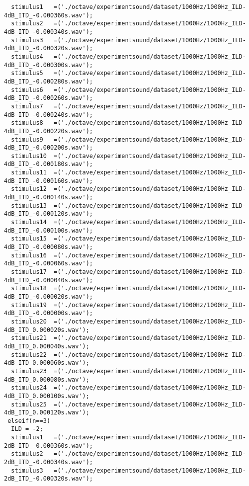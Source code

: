 {\begin{verbatim}
  stimulus1   =('./octave/experimentsound/dataset/1000Hz/1000Hz_ILD-4dB_ITD_-0.000360s.wav');
  stimulus2   =('./octave/experimentsound/dataset/1000Hz/1000Hz_ILD-4dB_ITD_-0.000340s.wav');
  stimulus3   =('./octave/experimentsound/dataset/1000Hz/1000Hz_ILD-4dB_ITD_-0.000320s.wav');
  stimulus4   =('./octave/experimentsound/dataset/1000Hz/1000Hz_ILD-4dB_ITD_-0.000300s.wav');
  stimulus5   =('./octave/experimentsound/dataset/1000Hz/1000Hz_ILD-4dB_ITD_-0.000280s.wav');
  stimulus6   =('./octave/experimentsound/dataset/1000Hz/1000Hz_ILD-4dB_ITD_-0.000260s.wav');
  stimulus7   =('./octave/experimentsound/dataset/1000Hz/1000Hz_ILD-4dB_ITD_-0.000240s.wav');
  stimulus8   =('./octave/experimentsound/dataset/1000Hz/1000Hz_ILD-4dB_ITD_-0.000220s.wav');
  stimulus9   =('./octave/experimentsound/dataset/1000Hz/1000Hz_ILD-4dB_ITD_-0.000200s.wav');
  stimulus10  =('./octave/experimentsound/dataset/1000Hz/1000Hz_ILD-4dB_ITD_-0.000180s.wav');
  stimulus11  =('./octave/experimentsound/dataset/1000Hz/1000Hz_ILD-4dB_ITD_-0.000160s.wav');
  stimulus12  =('./octave/experimentsound/dataset/1000Hz/1000Hz_ILD-4dB_ITD_-0.000140s.wav');
  stimulus13  =('./octave/experimentsound/dataset/1000Hz/1000Hz_ILD-4dB_ITD_-0.000120s.wav');
  stimulus14  =('./octave/experimentsound/dataset/1000Hz/1000Hz_ILD-4dB_ITD_-0.000100s.wav');
  stimulus15  =('./octave/experimentsound/dataset/1000Hz/1000Hz_ILD-4dB_ITD_-0.000080s.wav');
  stimulus16  =('./octave/experimentsound/dataset/1000Hz/1000Hz_ILD-4dB_ITD_-0.000060s.wav');
  stimulus17  =('./octave/experimentsound/dataset/1000Hz/1000Hz_ILD-4dB_ITD_-0.000040s.wav');
  stimulus18  =('./octave/experimentsound/dataset/1000Hz/1000Hz_ILD-4dB_ITD_-0.000020s.wav');
  stimulus19  =('./octave/experimentsound/dataset/1000Hz/1000Hz_ILD-4dB_ITD_-0.000000s.wav');
  stimulus20  =('./octave/experimentsound/dataset/1000Hz/1000Hz_ILD-4dB_ITD_0.000020s.wav');
  stimulus21  =('./octave/experimentsound/dataset/1000Hz/1000Hz_ILD-4dB_ITD_0.000040s.wav');
  stimulus22  =('./octave/experimentsound/dataset/1000Hz/1000Hz_ILD-4dB_ITD_0.000060s.wav');
  stimulus23  =('./octave/experimentsound/dataset/1000Hz/1000Hz_ILD-4dB_ITD_0.000080s.wav');
  stimulus24  =('./octave/experimentsound/dataset/1000Hz/1000Hz_ILD-4dB_ITD_0.000100s.wav');
  stimulus25  =('./octave/experimentsound/dataset/1000Hz/1000Hz_ILD-4dB_ITD_0.000120s.wav');
 elseif(n==3)
  ILD = -2;
  stimulus1   =('./octave/experimentsound/dataset/1000Hz/1000Hz_ILD-2dB_ITD_-0.000360s.wav');
  stimulus2   =('./octave/experimentsound/dataset/1000Hz/1000Hz_ILD-2dB_ITD_-0.000340s.wav');
  stimulus3   =('./octave/experimentsound/dataset/1000Hz/1000Hz_ILD-2dB_ITD_-0.000320s.wav');

\end{verbatim}}
